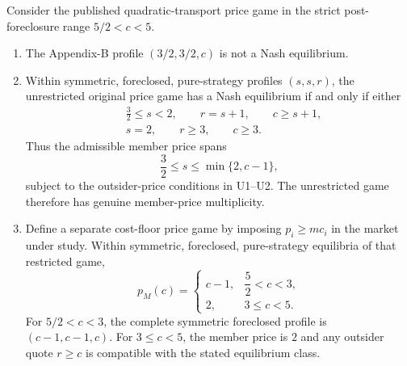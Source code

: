 \begin{proposition}\label{prop:equilibrium}
Consider the published quadratic-transport price game in the strict post-foreclosure range $5/2<c<5$.

\begin{enumerate}
\item The Appendix-B profile $(3/2,3/2,c)$ is not a Nash equilibrium.

\item Within symmetric, foreclosed, pure-strategy profiles $(s,s,r)$, the unrestricted original price game has a Nash equilibrium if and only if either
\begin{align*}
 &\frac32\leq s<2,\qquad r=s+1,\qquad c\geq s+1, \tag{U1}\\
 &s=2,\qquad r\geq3,\qquad c\geq3. \tag{U2}
\end{align*}
Thus the admissible member price spans
\begin{equation}\label{eq:unrestricted-member-set}
 \frac32\leq s\leq \min\{2,c-1\},
\end{equation}
subject to the outsider-price conditions in U1--U2. The unrestricted game therefore has genuine member-price multiplicity.

\item Define a separate cost-floor price game by imposing $p_i\geq mc_i$ in the market under study. Within symmetric, foreclosed, pure-strategy equilibria of that restricted game,
\begin{equation}\label{eq:piecewise-price}
 p_M(c)=
 \begin{cases}
 c-1, & \dfrac52<c<3,\\[4pt]
 2, & 3\leq c<5.
 \end{cases}
\end{equation}
For $5/2<c<3$, the complete symmetric foreclosed profile is $(c-1,c-1,c)$. For $3\leq c<5$, the member price is $2$ and any outsider quote $r\geq c$ is compatible with the stated equilibrium class.
\end{enumerate}
\end{proposition}

